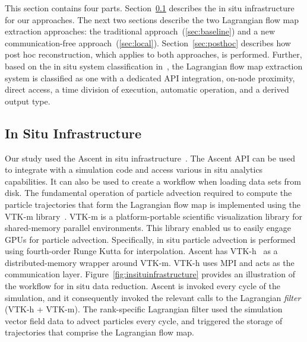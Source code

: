 This section contains four parts.
%
Section~\ref{sec:insituinfrastructure} describes the in situ infrastructure for our approaches.
%
The next two sections describe the two Lagrangian flow map extraction approaches:
the traditional approach~(\ref{sec:baseline}) and a new communication-free approach~(\ref{sec:local}).
%
Section~\ref{sec:posthoc} describes how post hoc reconstruction, which applies to both approaches, is performed.
%
%
Further, based on the in situ system classification in~\cite{childs2020istp}, the Lagrangian flow map extraction system is classified as one with a dedicated API integration, on-node proximity, direct access, a time division of execution, automatic operation, and a derived output type.

\subsection{In Situ Infrastructure}
\label{sec:insituinfrastructure}
Our study used the Ascent in situ infrastructure~\cite{Larsen2017Ascent}.
%
The Ascent API can be used to integrate with a simulation code and access various in situ analytics capabilities.
%
It can also be used to create a workflow when loading data sets from disk.
%
The fundamental operation of particle advection required to compute the particle trajectories that form the Lagrangian flow map is implemented using the VTK-m library~\cite{moreland2016vtk}.
%
VTK-m is a platform-portable scientific visualization library for shared-memory parallel environments. 
%
This library enabled us to easily engage GPUs for particle advection.
%
Specifically, in situ particle advection is performed using fourth-order Runge Kutta for interpolation.
%
Ascent has VTK-h~\cite{Larsen2017Ascent} as a distributed-memory wrapper around VTK-m.
%
VTK-h uses MPI and acts as the communication layer.
%
Figure~\ref{fig:insituinfrastructure} provides an illustration of the workflow for in situ data reduction.
%
Ascent is invoked every cycle of the simulation, and it consequently invoked the relevant calls to the Lagrangian \textit{filter} (VTK-h + VTK-m).
%
The rank-specific Lagrangian filter used the simulation vector field data to advect particles every cycle, and triggered the storage of trajectories that comprise the Lagrangian flow map. 
%



